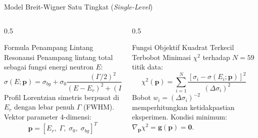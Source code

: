 \documentclass[aspectratio=169, 10pt]{beamer}
\begin{document}
\begin{frame}{Model Breit-Wigner Satu Tingkat (\textit{Single-Level})}
	\begin{columns}[T]
		\begin{column}{0.5\textwidth}
			\begin{block}{Formula Penampang Lintang Resonansi}
				\small
				Penampang lintang total sebagai fungsi energi neutron $E$:
				\begin{equation}
					\sigma(E; \mathbf{p}) = \sigma_{bg} + \sigma_0 \frac{(\Gamma/2)^2}{(E - E_r)^2 + (\Gamma/2)^2}
				\end{equation}
				\footnotesize
				Profil Lorentzian simetris berpusat di $E_r$ dengan lebar penuh $\Gamma$ (FWHM). Vektor parameter 4-dimensi:
				\begin{equation}
					\mathbf{p} = [E_r,\; \Gamma,\; \sigma_0,\; \sigma_{bg}]^T
				\end{equation}
			\end{block}
		\end{column}

		\begin{column}{0.5\textwidth}
			\begin{exampleblock}{Fungsi Objektif Kuadrat Terkecil Terbobot}
				\small
				Minimasi $\chi^2$ terhadap $N = 59$ titik data:
				\begin{equation}
					\chi^2(\mathbf{p}) = \sum_{i=1}^{N} \frac{\left[\sigma_i - \sigma(E_i;\mathbf{p})\right]^2}{(\Delta\sigma_i)^2}
				\end{equation}
				\footnotesize
				Bobot $w_i = (\Delta\sigma_i)^{-2}$ memperhitungkan ketidakpastian eksperimen. Kondisi minimum: $\nabla_{\mathbf{p}} \chi^2 = \mathbf{g}(\mathbf{p}) = \mathbf{0}$.
			\end{exampleblock}
		\end{column}
	\end{columns}
\end{frame}
\end{document}
